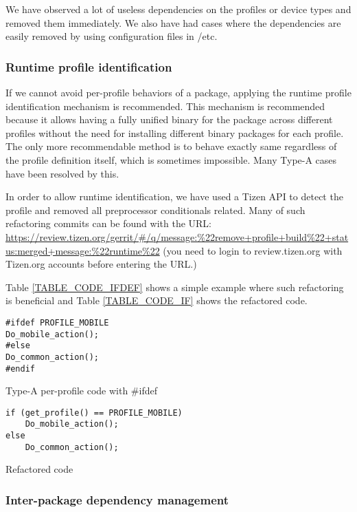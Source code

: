 We have observed a lot of useless dependencies on the profiles or device types and removed them immediately. We also have had cases where the dependencies are easily removed by using configuration files in /etc. 


\subsubsection{Runtime profile identification}\label{SS_RUntimeProfileId}

If we cannot avoid per-profile behaviors of a package, applying the runtime profile identification mechanism is recommended. This mechanism is recommended because it allows having a fully unified binary for the package across different profiles without the need for installing different binary packages for each profile. The only more recommendable method is to behave exactly same regardless of the profile definition itself, which is sometimes impossible. Many Type-A cases have been resolved by this.


In order to allow runtime identification, we have used a Tizen API to detect the profile and removed all preprocessor conditionals related. Many of such refactoring commits can be found with the URL: \url{https://review.tizen.org/gerrit/#/q/message:%22remove+profile+build%22+status:merged+message:%22runtime%22} (you need to login to review.tizen.org with Tizen.org accounts before entering the URL.)


Table \ref{TABLE_CODE_IFDEF} shows a simple example where such refactoring is beneficial and Table \ref{TABLE_CODE_IF} shows the refactored code. 

\begin{table}
\begin{verbatim}
#ifdef PROFILE_MOBILE
Do_mobile_action();
#else
Do_common_action();
#endif
\end{verbatim}
\label{TABLE_CODE_IFDEF}
\caption{Type-A per-profile code with \#ifdef}
\end{table}

\begin{table}
\begin{verbatim}
if (get_profile() == PROFILE_MOBILE)
    Do_mobile_action();
else
    Do_common_action();
\end{verbatim}
\label{TABLE_CODE_IF}
\caption{Refactored code}
\end{table}

\subsubsection{Inter-package dependency management}

